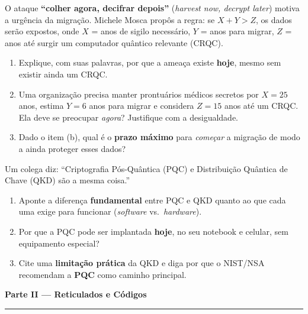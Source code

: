 \documentclass[11pt,a4paper]{article}
\newcommand{\parte}[1]{%
    \par\vspace{1.6em}\noindent
    {\large\bfseries\color{red!55!black}#1}%
    \par\nobreak\vspace{-0.4em}\noindent
    {\color{red!45!black}\rule{\linewidth}{1.0pt}}%
    \par\nobreak\vspace{0.2em}
}
\begin{document}
\begin{exercicio}
O ataque \textbf{``colher agora, decifrar depois''} (\textit{harvest now, decrypt later}) motiva a urg\^{e}ncia da migra\c{c}\~{a}o. Michele Mosca prop\^{o}s a regra: se $X + Y > Z$, os dados ser\~{a}o expostos, onde $X$ = anos de sigilo necess\'{a}rio, $Y$ = anos para migrar, $Z$ = anos at\'{e} surgir um computador qu\^{a}ntico relevante (CRQC).
\begin{enumerate}[label=(\alph*)]
    \item Explique, com suas palavras, por que a amea\c{c}a existe \textbf{hoje}, mesmo sem existir ainda um CRQC.
    \item Uma organiza\c{c}\~{a}o precisa manter prontu\'{a}rios m\'{e}dicos secretos por $X = 25$ anos, estima $Y = 6$ anos para migrar e considera $Z = 15$ anos at\'{e} um CRQC. Ela deve se preocupar \emph{agora}? Justifique com a desigualdade.
    \item Dado o item (b), qual \'{e} o \textbf{prazo m\'{a}ximo} para \emph{come\c{c}ar} a migra\c{c}\~{a}o de modo a ainda proteger esses dados?
\end{enumerate}
\end{exercicio}

\begin{exercicio}
Um colega diz: ``Criptografia P\'{o}s-Qu\^{a}ntica (PQC) e Distribui\c{c}\~{a}o Qu\^{a}ntica de Chave (QKD) s\~{a}o a mesma coisa.''
\begin{enumerate}[label=(\alph*)]
    \item Aponte a diferen\c{c}a \textbf{fundamental} entre PQC e QKD quanto ao que cada uma exige para funcionar (\emph{software} vs.\ \emph{hardware}).
    \item Por que a PQC pode ser implantada \textbf{hoje}, no seu notebook e celular, sem equipamento especial?
    \item Cite uma \textbf{limita\c{c}\~{a}o pr\'{a}tica} da QKD e diga por que o NIST/NSA recomendam a \textbf{PQC} como caminho principal.
\end{enumerate}
\end{exercicio}

\parte{Parte II --- Reticulados e C\'{o}digos}
\end{document}
